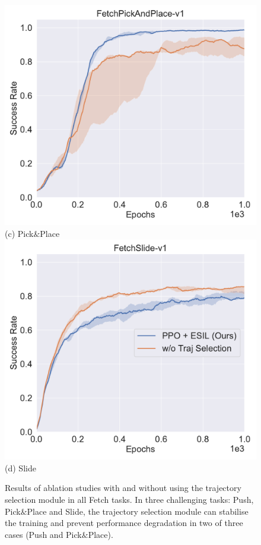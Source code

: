 \begin{figure}[h!]
  \includegraphics[width=\linewidth]{figures/chapter3/pick_hs.pdf}
  ({c}) Pick$\&$Place
\endminipage
{}%
  \centering
  \includegraphics[width=\linewidth]{figures/chapter3/slide_hs.pdf}
  ({d}) Slide
\endminipage\hfill
\caption[Results of ablation studies of the trajectory selection module.]{Results of ablation studies with and without using the trajectory selection module in all Fetch tasks. In three challenging tasks: Push, Pick$\&$Place and Slide, the trajectory selection module can stabilise the training and prevent performance degradation in two of three cases (Push and Pick$\&$Place).}
\label{fig:hs_compare}
\end{figure}

